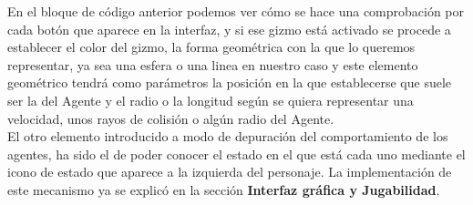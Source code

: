 En el bloque de código anterior podemos ver cómo se hace una comprobación por cada botón que aparece en la interfaz, y si ese gizmo está activado se procede a establecer el color del gizmo, la forma geométrica con la que lo queremos representar, ya sea una esfera o una linea en nuestro caso y este elemento geométrico tendrá como parámetros la posición en la que establecerse que suele ser la del Agente y el radio o la longitud según se quiera representar una velocidad, unos rayos de colisión o algún radio del Agente.\\

El otro elemento introducido a modo de depuración del comportamiento de los agentes, ha sido el de poder conocer el estado en el que está cada uno mediante el icono de estado que aparece a la izquierda del personaje. La implementación de este mecanismo ya se explicó en la sección \textbf{Interfaz gráfica y Jugabilidad}.